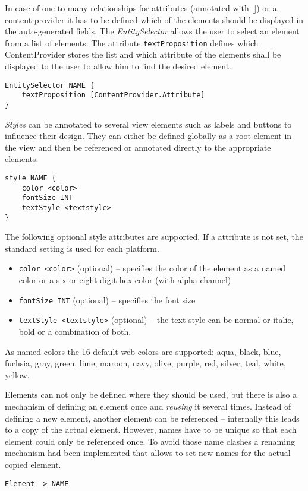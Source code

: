 In case of one-to-many relationships for attributes (annotated with []) or a content provider it has to be defined which of the elements should be displayed in the auto-generated fields. The \textit{EntitySelector} allows the user to select an element from a list of elements. The attribute \lstinline!textProposition! defines which ContentProvider stores the list and which attribute of the elements shall be displayed to the user to allow him to find the desired element.
\begin{lstlisting}
EntitySelector NAME {
	textProposition [ContentProvider.Attribute]
}
\end{lstlisting}

\textit{Styles} can be annotated to several view elements such as labels and buttons to influence their design. They can either be defined globally as a root element in the view and then be referenced or annotated directly to the appropriate elements.
\begin{lstlisting}
style NAME {
	color <color>
	fontSize INT
	textStyle <textstyle>
}
\end{lstlisting}

The following optional style attributes are supported. If a attribute is not set, the standard setting is used for each platform.
\begin{itemize}
\item \lstinline!color <color>! (optional) -- specifies the color of the element as a named color or a six or eight digit hex color (with alpha channel)
\item \lstinline!fontSize INT! (optional) -- specifies the font size
\item \lstinline!textStyle <textstyle>! (optional) -- the text style can be normal or italic, bold or a combination of both.
\end{itemize}

As named colors the 16 default web colors are supported: aqua, black, blue, fuchsia, gray, green, lime, maroon, navy, olive, purple, red, silver, teal, white, yellow.

Elements can not only be defined where they should be used, but there is also a mechanism of defining an element once and \textit{reusing} it several times. Instead of defining a new element, another element can be referenced -- internally this leads to a copy of the actual element. However, names have to be unique so that each element could only be referenced once. To avoid those name clashes a renaming mechanism had been implemented that allows to set new names for the actual copied element.
\begin{lstlisting}
Element -> NAME
\end{lstlisting}
